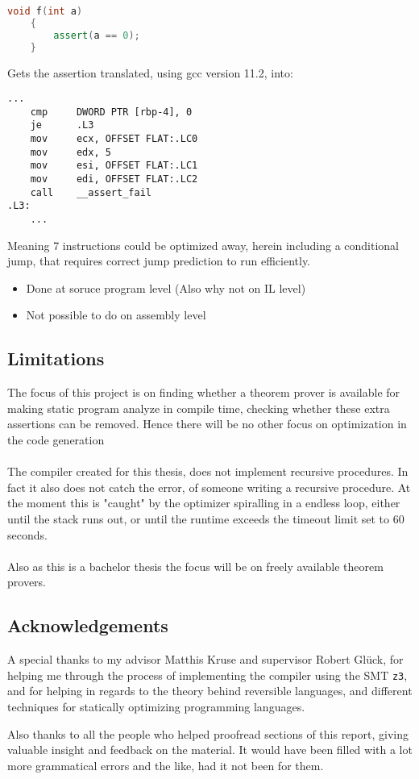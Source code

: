 \begin{lstlisting}[language=c++]
    void f(int a)
    {
        assert(a == 0);
    }
\end{lstlisting}
\noindent
Gets the assertion translated, using gcc version 11.2, into:

\begin{lstlisting}[language={[x86masm]Assembler}]
    ...
    cmp     DWORD PTR [rbp-4], 0
    je      .L3
    mov     ecx, OFFSET FLAT:.LC0
    mov     edx, 5
    mov     esi, OFFSET FLAT:.LC1
    mov     edi, OFFSET FLAT:.LC2
    call    __assert_fail
.L3:
    ...
\end{lstlisting}
\noindent
Meaning 7 instructions could be optimized away, herein including a conditional jump,
that requires correct jump prediction to run efficiently.

\begin{itemize}
    \item Done at soruce program level (Also why not on IL level)
    \item Not possible to do on assembly level
\end{itemize}

\subsection{Limitations \rr}
The focus of this project is on finding whether a theorem prover is available for making static
program analyze in compile time, checking whether these extra assertions can be removed. Hence
there will be no other focus on optimization in the code generation
\\
\\
The compiler created for this thesis, does not implement recursive procedures. In fact it also
does not catch the error, of someone writing a recursive procedure. At the moment this is "caught"
by the optimizer spiralling in a endless loop, either until the stack runs out, or until the
runtime exceeds the timeout limit set to $60$ seconds.
\\
\\
Also as this is a bachelor thesis the focus will be on freely available theorem provers.

\subsection{Acknowledgements \rr}
A special thanks to my advisor Matthis Kruse and supervisor Robert Glück, for helping me through
the process of implementing the compiler using the SMT \texttt{z3}, and for helping in regards to
the theory behind reversible languages, and different techniques for statically optimizing
programming languages.

Also thanks to all the people who helped proofread sections of this report, giving valuable
insight and feedback on the material. It would have been filled with a lot more grammatical errors
and the like, had it not been for them.